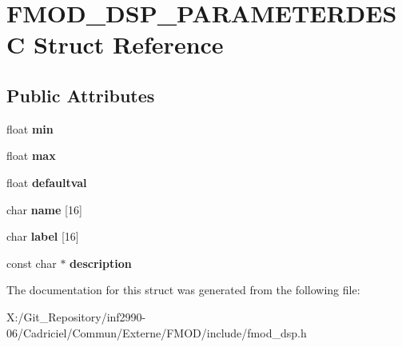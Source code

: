 \hypertarget{struct_f_m_o_d___d_s_p___p_a_r_a_m_e_t_e_r_d_e_s_c}{\section{F\-M\-O\-D\-\_\-\-D\-S\-P\-\_\-\-P\-A\-R\-A\-M\-E\-T\-E\-R\-D\-E\-S\-C Struct Reference}
\label{struct_f_m_o_d___d_s_p___p_a_r_a_m_e_t_e_r_d_e_s_c}
}
\subsection*{Public Attributes}
\begin{DoxyCompactItemize}
\item 
\hypertarget{struct_f_m_o_d___d_s_p___p_a_r_a_m_e_t_e_r_d_e_s_c_a6a70d0988ed0a13192f2d2beb2bd5595}{float {\bfseries min}}\label{struct_f_m_o_d___d_s_p___p_a_r_a_m_e_t_e_r_d_e_s_c_a6a70d0988ed0a13192f2d2beb2bd5595}

\item 
\hypertarget{struct_f_m_o_d___d_s_p___p_a_r_a_m_e_t_e_r_d_e_s_c_aabb0d4e04d947e9830378115e3085402}{float {\bfseries max}}\label{struct_f_m_o_d___d_s_p___p_a_r_a_m_e_t_e_r_d_e_s_c_aabb0d4e04d947e9830378115e3085402}

\item 
\hypertarget{struct_f_m_o_d___d_s_p___p_a_r_a_m_e_t_e_r_d_e_s_c_a9f47edb0a65cceaa81dd3cc77a272734}{float {\bfseries defaultval}}\label{struct_f_m_o_d___d_s_p___p_a_r_a_m_e_t_e_r_d_e_s_c_a9f47edb0a65cceaa81dd3cc77a272734}

\item 
\hypertarget{struct_f_m_o_d___d_s_p___p_a_r_a_m_e_t_e_r_d_e_s_c_a1619c32ff0267079429a9fa4c76f5745}{char {\bfseries name} \mbox{[}16\mbox{]}}\label{struct_f_m_o_d___d_s_p___p_a_r_a_m_e_t_e_r_d_e_s_c_a1619c32ff0267079429a9fa4c76f5745}

\item 
\hypertarget{struct_f_m_o_d___d_s_p___p_a_r_a_m_e_t_e_r_d_e_s_c_a989bbcd725bbe64d8ec330be19037d78}{char {\bfseries label} \mbox{[}16\mbox{]}}\label{struct_f_m_o_d___d_s_p___p_a_r_a_m_e_t_e_r_d_e_s_c_a989bbcd725bbe64d8ec330be19037d78}

\item 
\hypertarget{struct_f_m_o_d___d_s_p___p_a_r_a_m_e_t_e_r_d_e_s_c_aff99d44f94a9bcded22e7a24a8976f41}{const char $\ast$ {\bfseries description}}\label{struct_f_m_o_d___d_s_p___p_a_r_a_m_e_t_e_r_d_e_s_c_aff99d44f94a9bcded22e7a24a8976f41}

\end{DoxyCompactItemize}


The documentation for this struct was generated from the following file\-:\begin{DoxyCompactItemize}
\item 
X\-:/\-Git\-\_\-\-Repository/inf2990-\/06/\-Cadriciel/\-Commun/\-Externe/\-F\-M\-O\-D/include/fmod\-\_\-dsp.\-h\end{DoxyCompactItemize}
